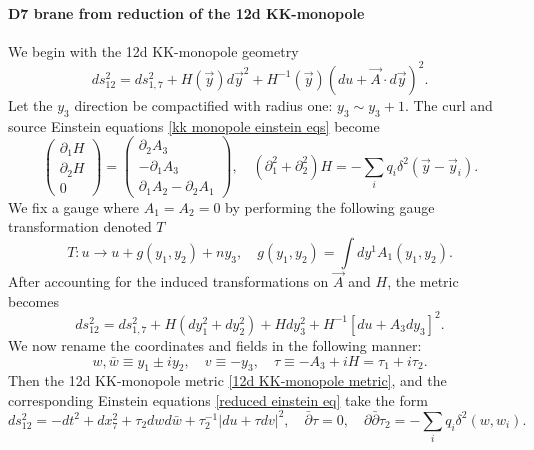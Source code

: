 \paragraph{D7 brane from reduction of the 12d KK-monopole}
We begin with the 12d KK-monopole geometry
\begin{equation}
ds_{12}^2=ds_{1,7}^2+H(\vec{y})d\vec{y}^2 + H^{-1}(\vec{y})(du+\vec{A} \cdot d\vec{y})^2.
\label{12d KK-monopole metric}
\end{equation}
Let the $y_3$ direction be compactified with radius one: $y_3\sim y_3 + 1$.
The curl and source Einstein equations \eqref{kk monopole einstein eqs} become
\begin{equation}
\begin{pmatrix}
\partial_1 H\\
\partial_2 H\\
0
\end{pmatrix}
=\begin{pmatrix}
\partial_2 A_3\\
-\partial_1 A_3\\
\partial_1 A_2-\partial_2 A_1
\end{pmatrix},\quad
(\partial_1^2+\partial_2^2)H=-\sum_iq_i\delta^2(\vec{y}-\vec{y}_i).
\label{reduced einstein eq}
\end{equation}
We fix a gauge where $A_1=A_2=0$ by performing the following gauge transformation denoted $T$
\begin{equation}
T:u\to u+g(y_1,y_2)+ny_3,\quad
g(y_1,y_2)=\int dy^1 A_1 (y_1,y_2).
\label{T gauge transformation}
\end{equation}
After accounting for the induced transformations on $\vec{A}$ and $H$, the metric becomes
\begin{equation}
ds_{12}^2=ds_{1,7}^2+
H(dy_{1}^2 + dy_2^2)
+Hdy_3^2
+H^{-1}[du+A_3dy_3]^2.
\end{equation}
We now rename the coordinates and fields in the following manner:
\begin{equation}
w,\bar w\equiv y_1\pm i y_2,\quad 
v\equiv - y_3,\quad
\tau \equiv-A_3+iH=\tau_1+i\tau_2.
\end{equation}
Then the 12d KK-monopole metric \eqref{12d KK-monopole metric}, and the corresponding Einstein equations \eqref{reduced einstein eq} take the form
\begin{equation}
ds_{12}^2=-dt^2 +dx_7^2+\tau_2 dwd\bar w + \tau_2^{-1}|du+\tau dv|^2,\quad
\bar\partial \tau = 0,\quad
\partial\bar\partial \tau_2=-\sum_i q_i \delta^2(w,w_i).
\label{12d KK-monopole in complex coordinates}
\end{equation}
